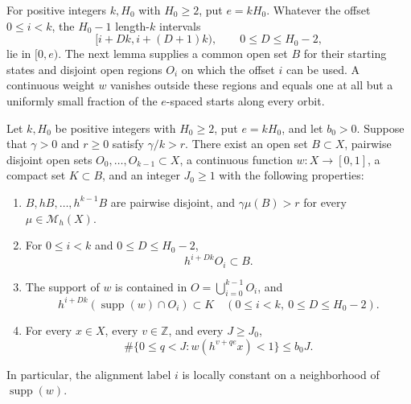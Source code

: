 For positive integers $k,H_0$ with $H_0\ge2$, put $e=kH_0$.
Whatever the offset $0\le i<k$, the $H_0-1$ length-$k$ intervals
\[
 [i+Dk,i+(D+1)k),\qquad 0\le D\le H_0-2,
\]
lie in $[0,e)$. The next lemma supplies a common open set $B$ for
their starting states and disjoint open regions $O_i$ on which the
offset $i$ can be used. A continuous weight $w$ vanishes outside
these regions and equals one at all but a uniformly small fraction
of the $e$-spaced starts along every orbit.

\begin{lemma}
\label{lem:uniform-block-allocation}
Let $k,H_0$ be positive integers with $H_0\geq2$, put $e=kH_0$, and let
$b_0>0$.  Suppose that $\gamma>0$ and $r\geq0$ satisfy
$\gamma/k>r$.  There exist an open set $B\subset X$, pairwise disjoint
open sets $O_0,\ldots,O_{k-1}\subset X$, a continuous function
$w:X\to[0,1]$, a compact set $K\subset B$, and an integer $J_0\geq1$
with the following properties:
\begin{enumerate}
\item $B,hB,\ldots,h^{k-1}B$ are pairwise disjoint, and
      $\gamma\mu(B)>r$ for every $\mu\in\mathcal M_h(X)$.
\item For $0\leq i<k$ and $0\leq D\leq H_0-2$,
      \begin{equation}
      \label{eq:allocated-block-starts}
        h^{i+Dk}O_i\subset B.
      \end{equation}
\item The support of $w$ is contained in $O=\bigcup_{i=0}^{k-1}O_i$,
      and
      \begin{equation}
      \label{eq:compact-selected-starts}
       h^{i+Dk}(\operatorname{supp}(w)\cap O_i)\subset K
       \quad(0\leq i<k,\ 0\leq D\leq H_0-2).
      \end{equation}
\item For every $x\in X$, every $v\in\mathbb Z$, and every $J\geq J_0$,
      \begin{equation}
      \label{eq:uniform-bad-block-count}
       \#\{0\leq q<J:w(h^{v+qe}x)<1\}\leq b_0J.
      \end{equation}
\end{enumerate}
In particular, the alignment label $i$ is locally constant on a
neighborhood of $\operatorname{supp}(w)$.
\end{lemma}

